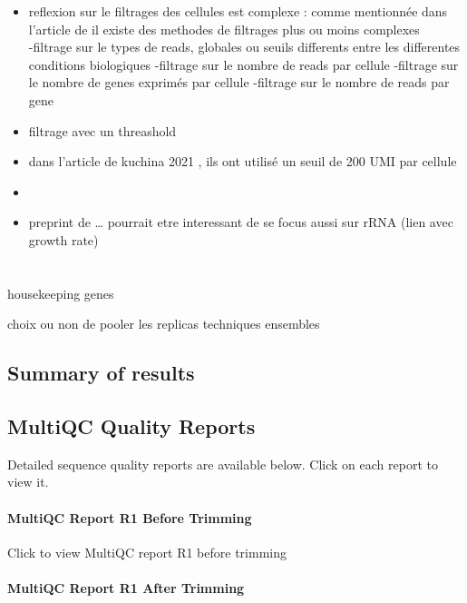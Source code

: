 \documentclass[
  11pt,
  a4paper,
]{report}
\begin{document}
\begin{itemize}
\item
  reflexion sur le filtrages des cellules est complexe : comme
  mentionnée dans l'article de il existe des methodes de filtrages plus
  ou moins complexes\\
  -filtrage sur le types de reads, globales ou seuils differents entre
  les differentes conditions biologiques -filtrage sur le nombre de
  reads par cellule -filtrage sur le nombre de genes exprimés par
  cellule -filtrage sur le nombre de reads par gene
\item
  filtrage avec un threashold
\item
  dans l'article de kuchina 2021 , ils ont utilisé un seuil de 200 UMI
  par cellule
\item
\item
  preprint de \ldots{} pourrait etre interessant de se focus aussi sur
  rRNA (lien avec growth rate)
\end{itemize}


\chapter{}\label{section}

housekeeping genes

choix ou non de pooler les replicas techniques ensembles

\section{Summary of results}\label{summary-of-results}

\section{MultiQC Quality Reports}\label{multiqc-quality-reports}

Detailed sequence quality reports are available below. Click on each
report to view it.

\subsubsection{MultiQC Report R1 Before Trimming}

Click to view MultiQC report R1 before trimming

\subsubsection{MultiQC Report R1 After Trimming}
\end{document}

